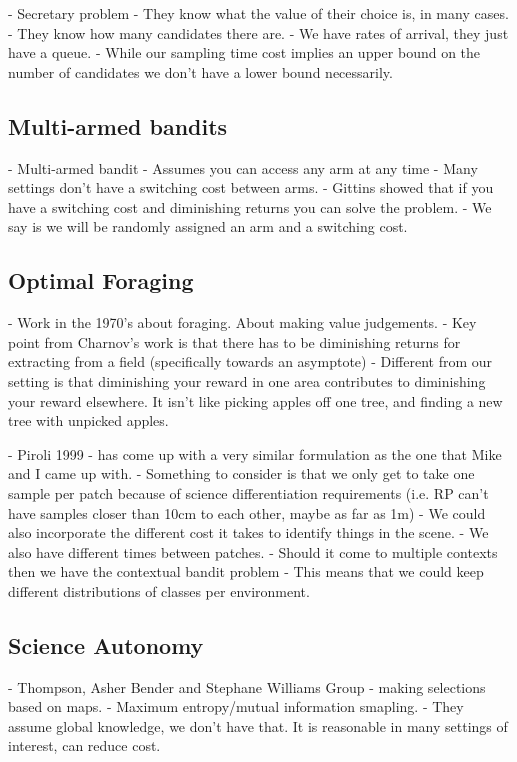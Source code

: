 		- Secretary problem
			- They know what the value of their choice is, in many cases.
			- They know how many candidates there are.
			- We have rates of arrival, they just have a queue.
			- While our sampling time cost implies an upper bound on the number of 
			candidates we don't have a lower bound necessarily.

\subsection{Multi-armed bandits}

		- Multi-armed bandit
			- Assumes you can access any arm at any time
			- Many settings don't have a switching cost between arms.
			- Gittins showed that if you have a switching cost and diminishing returns you can solve the problem.
			- We say is we will be randomly assigned an arm and a switching cost.

\subsection{Optimal Foraging}

	- Work in the 1970's about foraging.  About making value judgements.
		- Key point from Charnov's work is that there has to be diminishing returns
		for extracting from a field (specifically towards an asymptote)
		- Different from our setting is that diminishing your reward in one area 
		contributes to diminishing your reward elsewhere. It isn't like picking
		apples off one tree, and finding a new tree with unpicked apples.


	- Piroli 1999 - has come up with a very similar formulation as the one that 
		Mike and I came up with.
		- Something to consider is that we only get to take one sample per patch 
			because of science differentiation requirements (i.e. RP can't have 
			samples closer than 10cm to each other, maybe as far as 1m)
		- We could also incorporate the different cost it takes to identify things 
			in the scene.
		- We also have different times between patches.
		- Should it come to multiple contexts then we have the contextual bandit 
			problem
				- This means that we could keep different distributions of classes per 
					environment.


\subsection{Science Autonomy}

	- Thompson, Asher Bender and Stephane Williams Group
			- making selections based on maps.  
			- Maximum entropy/mutual information smapling.
			- They assume global knowledge, we don't have that.  It is reasonable
			in many settings of interest, can reduce cost.


